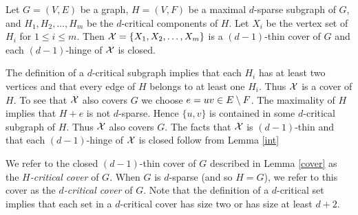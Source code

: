 \documentclass[11pt]{article}
\begin{document}
\begin{lemma}\label{cover}
Let $G=(V,E)$ be a graph, $H=(V,F)$ be a maximal $d$-sparse subgraph
of $G$, and  $H_1,H_2,\ldots,H_m$ be the  $d$-critical components of
$H$. Let $X_i$ be the vertex set of $H_i$ for  $1\leq i \leq m$.
Then ${\cal X}=\{X_1, X_2,\ldots, X_m\}$ is a $(d-1)$-thin cover of
$G$ and each $(d-1)$-hinge of ${\cal X}$ is closed.
\end{lemma}
\bproof The definition of a $d$-critical subgraph implies that each
$H_i$ has at least two vertices and that every edge of $H$ belongs
to at least one $H_i$. Thus ${\cal X}$ is a cover of $H$. To see that
${\cal X}$ also covers $G$ we choose $e=uv\in E\setminus F$. The maximality
of $H$ implies that $H+e$ is not $d$-sparse. Hence $\{u,v\}$ is
contained in some $d$-critical subgraph of $H$. Thus ${\cal X}$ also
covers $G$. The facts that $\cal X$ is $(d-1)$-thin and that each
$(d-1)$-hinge of ${\cal X}$ is closed follow from Lemma \ref{int}
\eproof

We refer to the closed $(d-1)$-thin cover of $G$ described in Lemma
\ref{cover} as the {\em $H$-critical cover} of $G$. When $G$ is
$d$-sparse (and so $H=G$), we refer to this cover as the  {\em
$d$-critical cover} of $G$. Note that the definition of a
$d$-critical set implies that each set in a $d$-critical cover has
size two or has size at least $d+2$.
\end{document}
